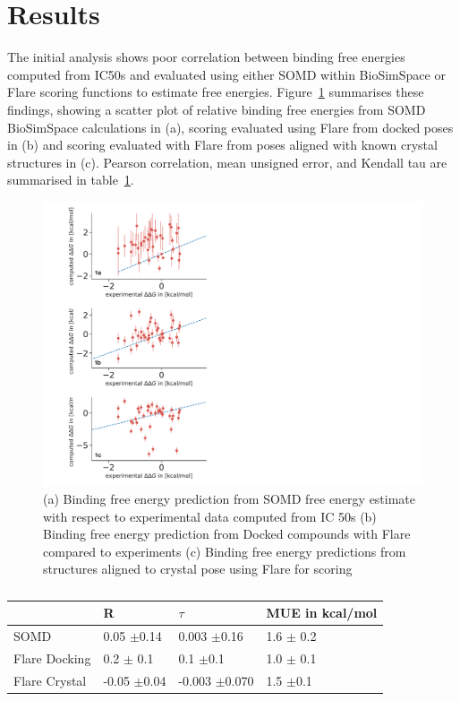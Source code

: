 \documentclass[9pt,comparison]{livecoms}
\begin{document}
\section{Results}
The initial analysis shows poor correlation between binding free energies computed from IC50s and evaluated using either SOMD within BioSimSpace or Flare scoring functions to estimate free energies. Figure~\ref{fig:fig1} summarises these findings, showing a scatter plot of relative binding free energies from SOMD BioSimSpace calculations in (a), scoring evaluated using Flare from docked poses in (b) and scoring evaluated with Flare from poses aligned with known crystal structures in (c). Pearson correlation, mean unsigned error, and Kendall tau are summarised in table~\ref{tab:tab1}.  
\begin{figure}
\includegraphics[width=\columnwidth]{figures/Fig1/Fig1.pdf}
\caption{\label{fig:fig1} (a) Binding free energy prediction from SOMD free energy estimate with respect to experimental data computed from IC 50s (b) Binding free energy prediction from Docked compounds with Flare compared to experiments (c) Binding free energy predictions from structures aligned to crystal pose using Flare for scoring }
\end{figure}
\begin{table}[]
\begin{tabular}{|l|lll}
\hline
              & \multicolumn{1}{l|}{R} & \multicolumn{1}{l|}{$\tau$} & \multicolumn{1}{l|}{MUE in kcal/mol} \\ \hline
SOMD          & 0.05 $\pm$0.14         & 0.003 $\pm$0.16             & 1.6 $\pm$ 0.2                        \\ \cline{1-1}
Flare Docking & 0.2 $\pm$ 0.1          & 0.1 $\pm$0.1                & 1.0 $\pm$ 0.1                        \\ \cline{1-1}
Flare Crystal & -0.05 $\pm$0.04        & -0.003 $\pm$0.070           & 1.5 $\pm$0.1                         \\ \hline
\end{tabular}
\caption{\label{tab:tab1}}
\end{table}
\end{document}
